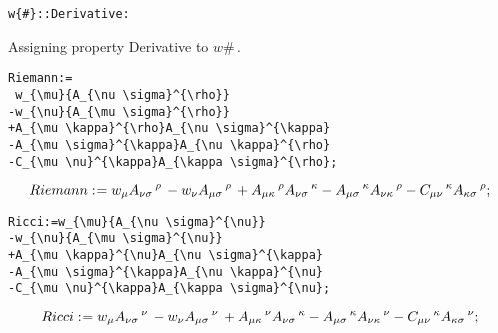 \documentclass[11pt]{article}
\def\specialcolon{\mathrel{\mathop{:}}\hspace{-.5em}}
\begin{document}
{\color[named]{Blue}\begin{verbatim}
w{#}::Derivative:
\end{verbatim}}
Assigning property Derivative to $w{\#}\, $.
\\
{\color[named]{Blue}\begin{verbatim}
Riemann:=
 w_{\mu}{A_{\nu \sigma}^{\rho}}
-w_{\nu}{A_{\mu \sigma}^{\rho}}
+A_{\mu \kappa}^{\rho}A_{\nu \sigma}^{\kappa}
-A_{\mu \sigma}^{\kappa}A_{\nu \kappa}^{\rho}
-C_{\mu \nu}^{\kappa}A_{\kappa \sigma}^{\rho};
\end{verbatim}}
\begin{dmath*}[compact, spread=2pt]
Riemann\specialcolon{}= {w}_{\mu}{{A}_{\nu \sigma}\,^{\rho}}\,  - {w}_{\nu}{{A}_{\mu \sigma}\,^{\rho}}\,  + {A}_{\mu \kappa}\,^{\rho} {A}_{\nu \sigma}\,^{\kappa} - {A}_{\mu \sigma}\,^{\kappa} {A}_{\nu \kappa}\,^{\rho} - {C}_{\mu \nu}\,^{\kappa} {A}_{\kappa \sigma}\,^{\rho};
\end{dmath*}
{\color[named]{Blue}\begin{verbatim}
Ricci:=w_{\mu}{A_{\nu \sigma}^{\nu}}
-w_{\nu}{A_{\mu \sigma}^{\nu}}
+A_{\mu \kappa}^{\nu}A_{\nu \sigma}^{\kappa}
-A_{\mu \sigma}^{\kappa}A_{\nu \kappa}^{\nu}
-C_{\mu \nu}^{\kappa}A_{\kappa \sigma}^{\nu};
\end{verbatim}}
\begin{dmath*}[compact, spread=2pt]
Ricci\specialcolon{}= {w}_{\mu}{{A}_{\nu \sigma}\,^{\nu}}\,  - {w}_{\nu}{{A}_{\mu \sigma}\,^{\nu}}\,  + {A}_{\mu \kappa}\,^{\nu} {A}_{\nu \sigma}\,^{\kappa} - {A}_{\mu \sigma}\,^{\kappa} {A}_{\nu \kappa}\,^{\nu} - {C}_{\mu \nu}\,^{\kappa} {A}_{\kappa \sigma}\,^{\nu};
\end{dmath*}
\end{document}
